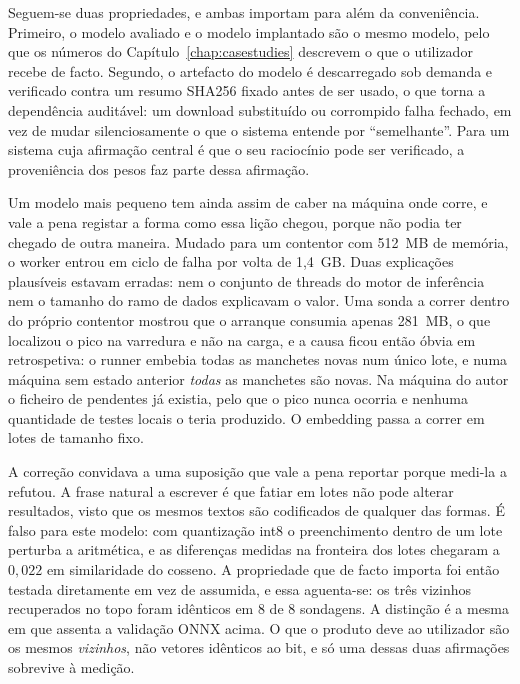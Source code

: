 Seguem-se duas propriedades, e ambas importam para além da conveniência. Primeiro, o modelo avaliado e o
modelo implantado são o mesmo modelo, pelo que os números do Capítulo~\ref{chap:casestudies} descrevem o
que o utilizador recebe de facto. Segundo, o artefacto do modelo é descarregado sob demanda e verificado
contra um resumo SHA256 fixado antes de ser usado, o que torna a dependência auditável: um download
substituído ou corrompido falha fechado, em vez de mudar silenciosamente o que o sistema entende por
``semelhante''. Para um sistema cuja afirmação central é que o seu raciocínio pode ser verificado, a
proveniência dos pesos faz parte dessa afirmação.

Um modelo mais pequeno tem ainda assim de caber na máquina onde corre, e vale a pena registar a forma
como essa lição chegou, porque não podia ter chegado de outra maneira. Mudado para um contentor com
512~MB de memória, o worker entrou em ciclo de falha por volta de 1,4~GB. Duas explicações plausíveis
estavam erradas: nem o conjunto de threads do motor de inferência nem o tamanho do ramo de dados
explicavam o valor. Uma sonda a correr dentro do próprio contentor mostrou que o arranque consumia
apenas 281~MB, o que localizou o pico na varredura e não na carga, e a causa ficou então óbvia em
retrospetiva: o runner embebia todas as manchetes novas num único lote, e numa máquina sem estado
anterior \emph{todas} as manchetes são novas. Na máquina do autor o ficheiro de pendentes já existia,
pelo que o pico nunca ocorria e nenhuma quantidade de testes locais o teria produzido. O embedding
passa a correr em lotes de tamanho fixo.

A correção convidava a uma suposição que vale a pena reportar porque medi-la a refutou. A frase natural
a escrever é que fatiar em lotes não pode alterar resultados, visto que os mesmos textos são
codificados de qualquer das formas. É falso para este modelo: com quantização int8 o preenchimento
dentro de um lote perturba a aritmética, e as diferenças medidas na fronteira dos lotes chegaram a
$0,022$ em similaridade do cosseno. A propriedade que de facto importa foi então testada diretamente em
vez de assumida, e essa aguenta-se: os três vizinhos recuperados no topo foram idênticos em $8$ de $8$
sondagens. A distinção é a mesma em que assenta a validação ONNX acima. O que o produto deve ao
utilizador são os mesmos \emph{vizinhos}, não vetores idênticos ao bit, e só uma dessas duas afirmações
sobrevive à medição.

